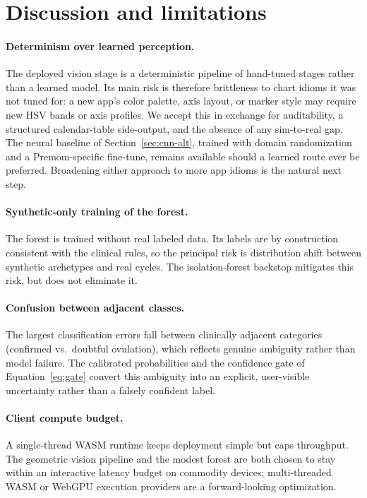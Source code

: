 \documentclass[11pt,a4paper]{article}
\begin{document}
\section{Discussion and limitations}

\paragraph{Determinism over learned perception.} The deployed vision stage
is a deterministic pipeline of hand-tuned stages rather than a learned
model. Its main risk is therefore brittleness to chart idioms it was not
tuned for: a new app's color palette, axis layout, or marker style may
require new HSV bands or axis profiles. We accept this in exchange for
auditability, a structured calendar-table side-output, and the absence of
any sim-to-real gap. The neural baseline of Section~\ref{sec:cnn-alt},
trained with domain randomization and a Premom-specific fine-tune, remains
available should a learned route ever be preferred. Broadening either
approach to more app idioms is the natural next step.

\paragraph{Synthetic-only training of the forest.} The forest is trained
without real labeled data. Its labels are by construction consistent with
the clinical rules, so the principal risk is distribution shift between
synthetic archetypes and real cycles. The isolation-forest backstop
mitigates this risk, but does not eliminate it.

\paragraph{Confusion between adjacent classes.} The largest classification errors
fall between clinically adjacent categories (confirmed vs.\ doubtful ovulation),
which reflects genuine ambiguity rather than model failure. The calibrated
probabilities and the confidence gate of Equation~\eqref{eq:gate} convert this
ambiguity into an explicit, user-visible uncertainty rather than a falsely
confident label.

\paragraph{Client compute budget.} A single-thread WASM runtime keeps deployment
simple but caps throughput. The geometric vision pipeline and the modest forest
are both chosen to stay within an interactive latency budget on commodity
devices; multi-threaded WASM or WebGPU execution providers are a forward-looking
optimization.
\end{document}
